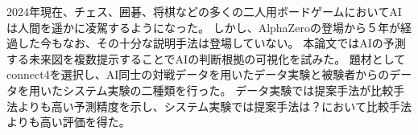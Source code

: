 \abstract
2024年現在、チェス、囲碁、将棋などの多くの二人用ボードゲームにおいてAIは人間を遥かに凌駕するようになった。
しかし、AlphaZero\cite{AlphaZero}の登場から５年が経過した今もなお、その十分な説明手法は登場していない。
本論文ではAIの予測する未来図を複数提示することでAIの判断根拠の可視化を試みた。
題材としてconnect4を選択し、AI同士の対戦データを用いたデータ実験と被験者からのデータを用いたシステム実験の二種類を行った。
データ実験では提案手法が比較手法よりも高い予測精度を示し、システム実験では提案手法は？において比較手法よりも高い評価を得た。